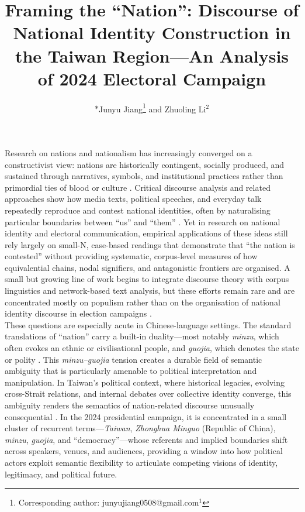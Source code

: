 \documentclass[man,12pt]{apa7}
\title{Framing the ``Nation'': Discourse of National Identity Construction in the Taiwan Region—An Analysis of 2024 Electoral Campaign}
\author{$*$Junyu Jiang\thanks{Corresponding author: junyujiang0508@gmail.com$^1$} and Zhuoling Li$^2$}
\begin{document}
\maketitle

Research on nations and nationalism has increasingly converged on a constructivist view: nations are historically contingent, socially produced, and sustained through narratives, symbols, and institutional practices rather than primordial ties of blood or culture \parencite{anderson1991,calhoun1997,dar2022,gellner1983,machin2015,miller1995,oran2022,smith1986,wodak2009a,bieber2020}. 
Critical discourse analysis and related approaches show how media texts, political speeches, and everyday talk repeatedly reproduce and contest national identities, 
often by naturalising particular boundaries between ``us'' and ``them'' \parencite{antonsich2015,machin2013,wodak2009a}. 
Yet in research on national identity and electoral communication, empirical applications of these ideas still rely largely on small-N, case-based readings that demonstrate that ``the nation is contested'' 
without providing systematic, corpus-level measures of how equivalential chains, nodal signifiers, and antagonistic frontiers are organised. 
A small but growing line of work begins to integrate discourse theory with corpus linguistics and network-based text analysis, 
but these efforts remain rare and are concentrated mostly on populism rather than on the organisation of national identity discourse in election campaigns \parencite{bakumov2022,nikisianis2018,semykina2021}.\\%
These questions are especially acute in Chinese-language settings. 
The standard translations of ``nation'' carry a built-in duality—most notably \emph{minzu}, which often evokes an ethnic or civilisational people, and \emph{guojia}, which denotes the state or polity \parencite{berry1992,bilik2007,cao2021,connor1978,lee2013,ma2017,banerjee2021,brubaker2004}. 
This \emph{minzu–guojia} tension creates a durable field of semantic ambiguity that is particularly amenable to political interpretation and manipulation. 
In Taiwan's political context, where historical legacies, evolving cross-Strait relations, and internal debates over collective identity converge, this ambiguity renders the semantics of nation-related discourse unusually consequential \parencite{cabestan2005,jiang2017,hur2020,shen2013}. 
In the 2024 presidential campaign, it is concentrated in a small cluster of recurrent terms—\emph{Taiwan}, \emph{Zhonghua Minguo} (Republic of China), \emph{minzu}, \emph{guojia}, and ``democracy''—whose referents and implied boundaries shift across speakers, venues, and audiences, providing a window into how political actors exploit semantic flexibility to articulate competing visions of identity, legitimacy, and political future.\\%
\end{document}
